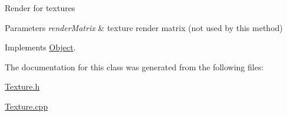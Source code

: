 Render for textures 
\begin{DoxyParams}{Parameters}
{\em render\+Matrix} & texture render matrix (not used by this method) \\
\hline
\end{DoxyParams}


Implements \hyperlink{classObject_af7b5e6c789269f331688537c0809fb82}{Object}.



The documentation for this class was generated from the following files\+:\begin{DoxyCompactItemize}
\item 
\hyperlink{Texture_8h}{Texture.\+h}\item 
\hyperlink{Texture_8cpp}{Texture.\+cpp}\end{DoxyCompactItemize}
